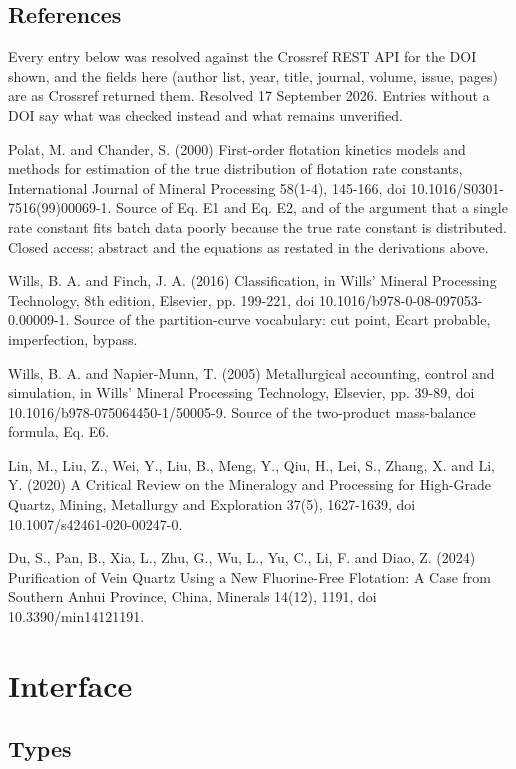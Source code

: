 \documentclass[10pt,a4paper,twoside]{report}
\begin{document}
\subsection*{References}

Every entry below was resolved against the Crossref REST API for the DOI shown, and the fields here (author list, year, title, journal, volume, issue, pages) are as Crossref returned them. Resolved 17 September 2026. Entries without a DOI say what was checked instead and what remains unverified.

Polat, M. and Chander, S. (2000) First-order flotation kinetics models and methods for estimation of the true distribution of flotation rate constants, International Journal of Mineral Processing 58(1-4), 145-166, doi 10.1016/S0301-7516(99)00069-1. Source of Eq. E1 and Eq. E2, and of the argument that a single rate constant fits batch data poorly because the true rate constant is distributed. Closed access; abstract and the equations as restated in the derivations above.

Wills, B. A. and Finch, J. A. (2016) Classification, in Wills' Mineral Processing Technology, 8th edition, Elsevier, pp. 199-221, doi 10.1016/b978-0-08-097053-0.00009-1. Source of the partition-curve vocabulary: cut point, Ecart probable, imperfection, bypass.

Wills, B. A. and Napier-Munn, T. (2005) Metallurgical accounting, control and simulation, in Wills' Mineral Processing Technology, Elsevier, pp. 39-89, doi 10.1016/b978-075064450-1/50005-9. Source of the two-product mass-balance formula, Eq. E6.

Lin, M., Liu, Z., Wei, Y., Liu, B., Meng, Y., Qiu, H., Lei, S., Zhang, X. and Li, Y. (2020) A Critical Review on the Mineralogy and Processing for High-Grade Quartz, Mining, Metallurgy and Exploration 37(5), 1627-1639, doi 10.1007/s42461-020-00247-0.

Du, S., Pan, B., Xia, L., Zhu, G., Wu, L., Yu, C., Li, F. and Diao, Z. (2024) Purification of Vein Quartz Using a New Fluorine-Free Flotation: A Case from Southern Anhui Province, China, Minerals 14(12), 1191, doi 10.3390/min14121191.

\section{Interface}

\subsection*{Types}
\end{document}
